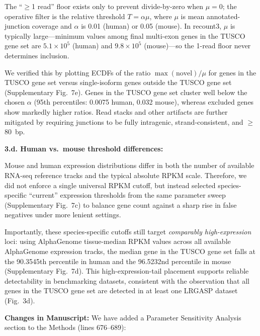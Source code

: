 \documentclass[11pt]{article}
\newcommand{\tuscoGeneSet}{TUSCO gene set}
\begin{document}
\begin{responseboxnew}
The ``$\geq$1 read'' floor exists only to prevent divide-by-zero when $\mu=0$; the operative filter is the relative threshold $T=\alpha\mu$, where $\mu$ is mean annotated-junction coverage and $\alpha$ is 0.01 (human) or 0.05 (mouse). In recount3, $\mu$ is typically large---minimum values among final multi-exon genes in the TUSCO gene set are $5.1\times10^5$ (human) and $9.8\times10^5$ (mouse)---so the 1-read floor never determines inclusion.

We verified this by plotting ECDFs of the ratio $\max(\text{novel})/\mu$ for genes in the TUSCO gene set versus single-isoform genes outside the TUSCO gene set (Supplementary Fig.~7e). Genes in the TUSCO gene set cluster well below the chosen $\alpha$ (95th percentiles: 0.0075 human, 0.032 mouse), whereas excluded genes show markedly higher ratios. Read stacks and other artifacts are further mitigated by requiring junctions to be fully intragenic, strand-consistent, and $\geq$80~bp.

\vspace{0.3cm}
\textbf{3.d. Human vs.\ mouse threshold differences:}

Mouse and human expression distributions differ in both the number of available RNA-seq reference tracks and the typical absolute RPKM scale. Therefore, we did not enforce a single universal RPKM cutoff, but instead selected species-specific ``current'' expression thresholds from the same parameter sweep (Supplementary Fig.~7c) to balance gene count against a sharp rise in false negatives under more lenient settings.

Importantly, these species-specific cutoffs still target \emph{comparably high-expression} loci: using AlphaGenome tissue-median RPKM values across all available AlphaGenome expression tracks, the median gene in the TUSCO gene set falls at the 90.3545th percentile in human and the 96.5232nd percentile in mouse (Supplementary Fig.~7d). This high-expression-tail placement supports reliable detectability in benchmarking datasets, consistent with the observation that all genes in the \tuscoGeneSet{} are detected in at least one LRGASP dataset (Fig.~3d).

\vspace{0.3cm}
\textbf{Changes in Manuscript:} We have added a Parameter Sensitivity Analysis section to the Methods (lines 676--689):


\end{responseboxnew}
\end{document}
